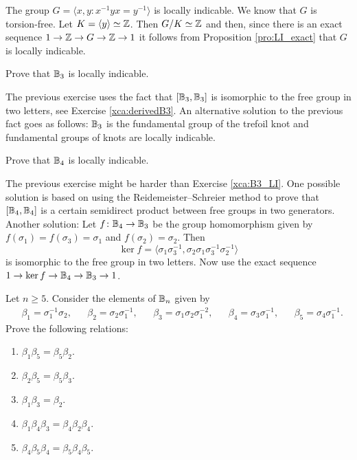 \begin{example}
    The group $G=\langle x,y:x^{-1}yx=y^{-1}\rangle$ is
    locally indicable. We know that $G$ is torsion-free. Let 
    $K=\langle y\rangle\simeq\mathbb{Z}$. Then $G/K\simeq\mathbb{Z}$ and 
    then, since there is an exact sequence
    $1\to\mathbb{Z}\to G\to\mathbb{Z}\to1$ 
    it follows from Proposition \ref{pro:LI_exact} 
    that $G$ is locally indicable.
\end{example}


\begin{exercise}
\label{xca:B3_LI}
    Prove that $\mathbb{B}_3$ is locally indicable. 
\end{exercise}

The previous exercise uses the fact that $[\mathbb{B}_3,\mathbb{B}_3]$ is isomorphic to the free group in two letters, see
Exercise \ref{xca:derivedB3}.
An alternative solution to the previous fact goes as follows: $\mathbb{B}_3$ is the fundamental group
of the trefoil knot and fundamental groups of knots are locally indicable. 

\begin{exercise}
    Prove that $\mathbb{B}_4$ is locally indicable.
\end{exercise}

The previous exercise might be harder than Exercise \ref{xca:B3_LI}. One possible solution
is based on using the Reidemeister--Schreier method to prove that 
$[\mathbb{B}_4,\mathbb{B}_4]$ is a certain semidirect product 
between free groups in two generators. Another solution: Let 
$f\colon\mathbb{B}_4\to\mathbb{B}_3$ be the group homomorphism given by $f(\sigma_1)=f(\sigma_3)=\sigma_1$ 
and $f(\sigma_2)=\sigma_2$. Then 
\[
\ker f=\langle \sigma_1\sigma_3^{-1},\sigma_2\sigma_1\sigma_3^{-1}\sigma_2^{-1}\rangle
\]
is isomorphic to the free group in two letters. Now use the exact sequence
$1\to \ker f\to\mathbb{B}_4\to\mathbb{B}_3\to1$. 

\begin{exercise}
\label{xca:relations}
    Let $n\geq5$. Consider the elements of $\mathbb{B}_n$ given by 
    \begin{align*}
        &\beta_1=\sigma_1^{-1}\sigma_2,
        &&\beta_2=\sigma_2\sigma_1^{-1}, 
        &&\beta_3=\sigma_1\sigma_2\sigma_1^{-2},
        &&\beta_4=\sigma_3\sigma_1^{-1}, 
        &&\beta_5=\sigma_4\sigma_1^{-1}.
    \end{align*}
    Prove the following relations:
    \begin{enumerate}
        \item $\beta_1\beta_5=\beta_5\beta_2$.
        \item $\beta_2\beta_5=\beta_5\beta_3$.
        \item $\beta_1\beta_3=\beta_2$.
        \item $\beta_1\beta_4\beta_3=\beta_4\beta_2\beta_4$.
        \item $\beta_4\beta_5\beta_4=\beta_5\beta_4\beta_5$.
    \end{enumerate}
\end{exercise}

